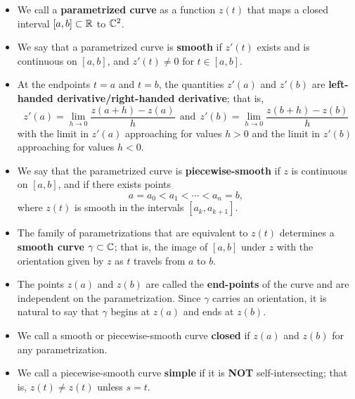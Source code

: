 \documentclass[11pt,a4paper]{book}
\begin{document}
\begin{definition}[Parametrization]
    \begin{itemize}
        \item We call a \textbf{parametrized curve} as a function \( z(t) \) that maps a closed interval \( [a,b] \subset \mathbb{R}  \) to \( \mathbb{C}^{2} \).
        \item We say that a parametrized curve is \textbf{smooth} if \( z'(t)\) exists and is continuous on \( [a,b] \), and \( z'(t) \neq 0 \) for \( t \in [a,b] \).
        \item At the endpoints \( t = a  \) and \( t = b  \), the quantities \( z'(a) \) and \( z'(b) \) are \textbf{left-handed derivative/right-handed derivative}; that is,  
            \[ z'(a) = \lim_{ h  \to 0  }  \frac{ z(a+h) - z(a)  }{ h  } \ \ \text{and} \ \ z'(b) = \lim_{ h \to 0 } \frac{ z(b+h) - z(b) }{ h  }    \]
            with the limit in \( z'(a) \) approaching for values \( h > 0  \) and the limit in \( z'(b) \) approaching for values \( h < 0  \).
        \item We say that the parametrized curve is \textbf{piecewise-smooth} if \( z  \) is continuous on \( [a,b] \), and if there exists points 
            \[  a = {a}_{0} < {a}_{1} < \cdots < {a}_{n} = b, \]
            where \( z(t) \) is smooth in the intervals \( [{a}_{k }, {a}_{k+1}] \).
    \end{itemize}
\end{definition}

\begin{definition}[ ]
    \begin{itemize}
        \item The family of parametrizations that are equivalent to \( z(t) \) determines a \textbf{smooth curve} \( \gamma \subset \mathbb{C}  \); that is, the image of \( [a,b] \) under \( z  \) with the orientation given by \( z  \) as \( t  \) travels from \( a \) to \( b \).
        \item The points \( z(a) \) and \( z(b) \) are called the \textbf{end-points} of the curve and are independent on the parametrization. Since \( \gamma \) carries an orientation, it is natural to say that \( \gamma \) begins at \( z(a) \) and ends at \( z(b) \).
        \item We call a smooth or piecewise-smooth curve \textbf{closed} if \( z(a) \) and \( z(b) \) for any parametrization. 
        \item We call a piecewise-smooth curve \textbf{simple} if it is \textbf{NOT} self-intersecting; that is, \( z(t) \neq z(t) \) unless \( s = t  \).   
    \end{itemize}
\end{definition}
\end{document}
